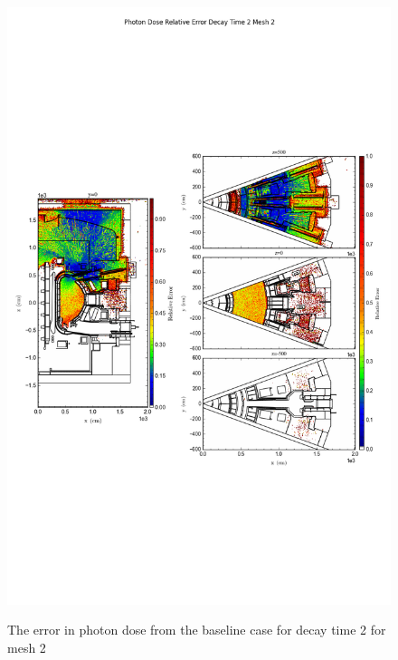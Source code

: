 \begin{figure}[ht!]
\centering
\includegraphics[trim={0cm 9cm 0cm 10cm},clip,scale=0.75]{../plots/final_model/Photon_Dose_Relative_Error_Decay_Time_2_Mesh_2.png}
\label{fig:photons_dc2_no4bc_m2_error}
\caption{The error in photon dose from the baseline case for decay time 2 for mesh 2}
\end{figure}
